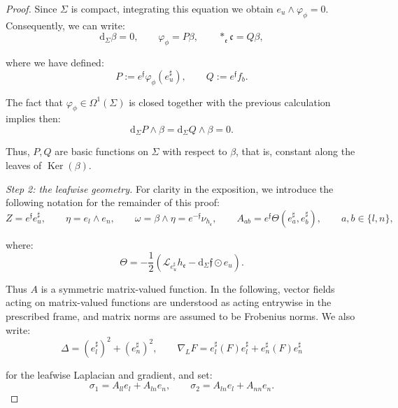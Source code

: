 \documentclass[10pt,reqno,a4paper]{amsart}
\theoremstyle{plain}
\theoremstyle{definition}
\theoremstyle{remark}
\theoremstyle{remark}
\def\dd{\mathrm{d}}
\def\cL{\mathcal{L}}
\def\frc{\mathfrak{c}}
\def\cL{\mathcal{L}}
\def\fre{\mathfrak{e}}
\newcommand{\Ker}{\operatorname{Ker}}
\renewcommand{\(}{ (}
\renewcommand{\)}{ )}
\newcommand{\frf}{\mathfrak{f}}
\begin{document}
\begin{proof}
\noindent
Since $\Sigma$ is compact, integrating this equation we obtain $e_u\wedge\varphi_{\phi}=0$. Consequently, we can write:
\begin{equation*}
\dd_{\Sigma}\beta=0, \qquad \varphi_{\phi}=P\beta, \qquad \ast_{\fre}\frc=Q\beta,
\end{equation*}
	
\noindent
where we have defined:
\begin{equation*}
P := e^{\frf}\varphi_{\phi}(e_u^{\sharp}), \qquad Q := e^{\frf}f_b.
\end{equation*}
	
\noindent
The fact that $\varphi_{\phi} \in \Omega^1(\Sigma)$ is closed together with the previous calculation implies then:
\begin{equation*}
\dd_{\Sigma}P\wedge\beta = \dd_{\Sigma}Q\wedge\beta=0.
\end{equation*}
	
\noindent
Thus, $P,Q$ are basic functions on $\Sigma$ with respect to $\beta$, that is, constant along the leaves of $\Ker(\beta)$.
	
\medskip
\noindent
\emph{Step 2: the leafwise geometry.}
For clarity in the exposition, we introduce the following notation for the remainder of this proof:
\begin{equation*}
Z=e^{\frf}e_u^{\sharp}, \qquad \eta=e_l\wedge e_n, \qquad \omega=\beta\wedge\eta=e^{-\frf}\nu_{h_{\fre}}, \qquad
		A_{ab}=e^{\frf}\Theta(e_a^{\sharp},e_b^{\sharp}),
		\qquad a,b\in\{l,n\},
\end{equation*}
	
\noindent
where:
\begin{equation*}
\Theta = -\frac{1}{2} (\cL_{e_u^{\sharp}}h_{\fre} -\dd_{\Sigma}\frf\odot e_u).
\end{equation*}
	
\noindent
Thus $A$ is a symmetric matrix-valued function. In the following, vector fields acting on matrix-valued functions are understood as acting entrywise in the prescribed frame, and matrix norms are assumed to be Frobenius norms. We also write:
\begin{equation*}
\Delta=(e_l^{\sharp})^2+(e_n^{\sharp})^2, \qquad \nabla_L F = e_l^{\sharp}(F)e_l^{\sharp} + e_n^{\sharp}(F)e_n^{\sharp}
\end{equation*}
	
\noindent
for the leafwise Laplacian and gradient, and set:
\begin{equation*}
\sigma_1=A_{ll}e_l+A_{ln}e_n, \qquad \sigma_2=A_{ln}e_l+A_{nn}e_n.
\end{equation*}
	

\end{proof}
\end{document}
